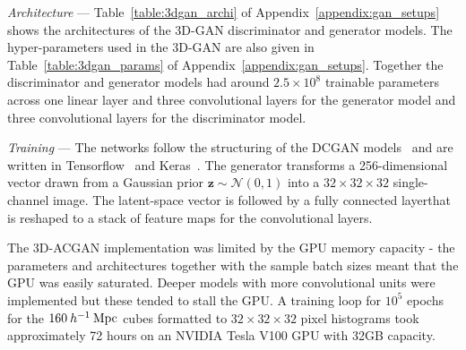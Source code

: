 \documentclass[twocolumn]{article}
\numberwithin{equation}{section}
\begin{document}


\textit{Architecture} --- 
Table~\ref{table:3dgan_archi} of Appendix~\ref{appendix:gan_setups} shows the architectures of the 3D-GAN discriminator 
and generator models. The hyper-parameters used in the 3D-GAN are also given in Table~\ref{table:3dgan_params} of 
Appendix~\ref{appendix:gan_setups}. Together the discriminator and generator models had around $2.5\times10^8$ trainable 
parameters across one linear layer and three convolutional layers for the generator model and three convolutional layers 
for the discriminator model. \\

{\setlength{\parindent}{0cm}
\textit{Training} --- 
The networks follow the structuring of the DCGAN models~\cite{dcgan} and are written in Tensorflow~\cite{tensorflow} and 
Keras~\cite{keras}. The generator transforms a 256-dimensional vector drawn from a Gaussian prior $\mathbf{z}\sim 
\mathcal{N}(0,1)$ into a $32 \times 32 \times 32$ single-channel image. The latent-space vector is followed by a fully 
connected layerthat is reshaped to a stack of feature maps for the convolutional layers. 

The 3D-ACGAN implementation was limited by the GPU memory capacity - the parameters and architectures together with the 
sample batch sizes meant that the GPU was easily saturated. Deeper models with more convolutional units were implemented 
but these tended to stall the GPU. A training loop for $10^5$ epochs for the $160 \: h^{-1}\: \textup{Mpc}$ cubes 
formatted to $32 \times 32 \times 32$ pixel histograms took approximately 72 hours on an NVIDIA Tesla V100 GPU with 
32GB capacity. 
}
\end{document}
